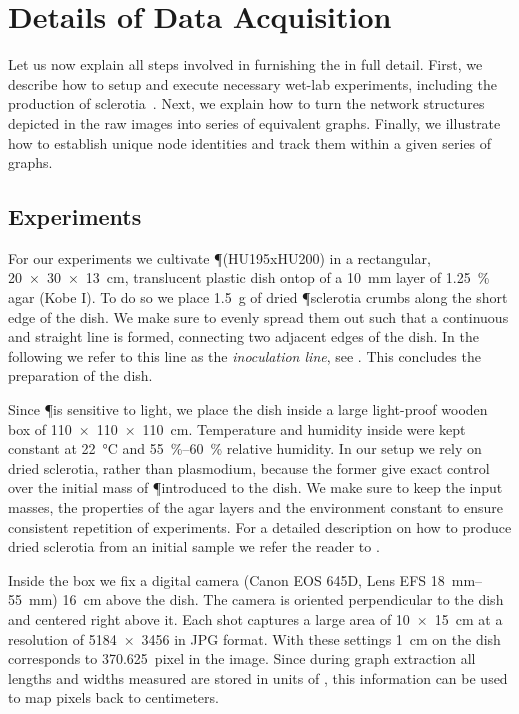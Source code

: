 
\chapter{Details of Data Acquisition}\label{app:smgr}

	Let us now explain all steps involved in furnishing the \data in full detail. First, we describe how to setup and execute necessary wet-lab experiments, including the production of sclerotia~\cite{lifecycle}. Next, we explain how to turn the network structures depicted in the raw images into series of equivalent graphs. Finally, we illustrate how to establish unique node identities and track them within a given series of graphs.

	\section{Experiments}

		For our experiments we cultivate \P (HU195xHU200) in a rectangular, \SI{20 x 30 x 13}{\centi\metre}, translucent plastic dish ontop of a \SI{10}{\milli\metre} layer of \SI{1.25}{\percent} agar (Kobe I). To do so we place \SI{1.5}{\gram} of dried \P sclerotia crumbs along the short edge of the dish. We make sure to evenly spread them out such that a continuous and straight line is formed, connecting two adjacent edges of the dish. In the following we refer to this line as the \emph{inoculation line}, see . This concludes the preparation of the dish. 

		Since \P is sensitive to light, we place the dish inside a large light-proof wooden box of \SI{110 x 110 x 110}{\centi\metre}. Temperature and humidity inside were kept constant at \SI{22}{\celsius} and \SIrange{55}{60}{\percent} relative humidity. In our setup we rely on dried sclerotia, rather than plasmodium, because the former give exact control over the initial mass of \P introduced to the dish. We make sure to keep the input masses, the properties of the agar layers and the environment constant to ensure consistent repetition of experiments. For a detailed description on how to produce dried sclerotia from an initial sample we refer the reader to .

		Inside the box we fix a digital camera (Canon EOS 645D, Lens EFS \SIrange{18}{55}{\milli\metre}) \SI{16}{\centi\metre} above the dish. The camera is oriented perpendicular to the dish and centered right above it. Each shot captures a large area of \SI{10 x 15}{\centi\metre} at a resolution of \SI{5184 x 3456}{\pixel} in JPG format. With these settings \SI{1}{\centi\metre} on the dish corresponds to \SI{370.625}{pixel} in the image. Since during graph extraction all lengths and widths measured are stored in units of \si{\pixel}, this information can be used to map pixels back to centimeters.

